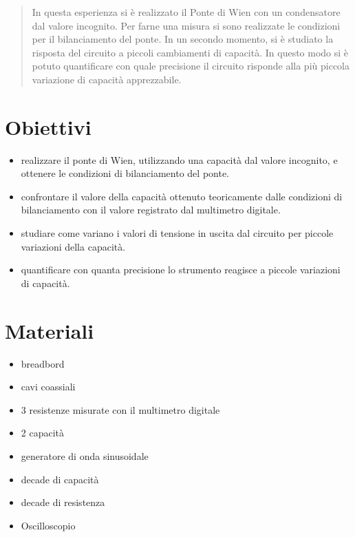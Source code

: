 \documentclass[12pt,]{article}
\begin{document}
 
	\newpage
	\renewcommand{\abstractname}{Abstract}

	\begin{abstract}
In questa esperienza si è realizzato il Ponte di Wien con un condensatore dal valore incognito. Per farne una misura si sono realizzate le condizioni per il bilanciamento del ponte. In un secondo momento, si è studiato la risposta del circuito a piccoli cambiamenti di capacità. In questo modo si è potuto quantificare con quale precisione il circuito risponde alla più piccola variazione di capacità apprezzabile. 

	\end{abstract}
  \vspace{10em}
\tableofcontents
  \newpage
  \section{Obiettivi}
  \begin{itemize}
  \item realizzare il ponte di Wien, utilizzando una capacità dal valore incognito, e ottenere le condizioni di bilanciamento del ponte. 
  \item confrontare il valore della capacità ottenuto teoricamente dalle condizioni di bilanciamento con il valore registrato dal multimetro digitale. 
  \item studiare come variano i valori di tensione in uscita dal circuito per  piccole variazioni della capacità. 
  \item quantificare con quanta precisione lo strumento reagisce a piccole variazioni di capacità. 
  \end{itemize}
  
\section{Materiali}
\begin{itemize}
\item breadbord
\item cavi coassiali 
\item 3 resistenze misurate con il multimetro digitale
\item 2 capacità
\item generatore di onda sinusoidale 
\item decade di capacità
\item decade di resistenza  
\item Oscilloscopio 
\end{itemize}
\end{document}
